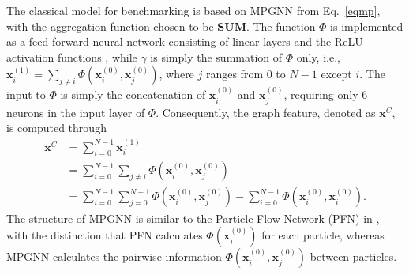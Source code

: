 \documentclass[reprint,amsmath,amssymb,prd,nofootinbib]{revtex4-2}
\def\xbf{\mathbf{x}}
\begin{document}
The classical model for benchmarking is based on MPGNN from Eq.~\ref{eqmp}, with the aggregation function chosen to be \textbf{SUM}. The function $\Phi$ is implemented as a feed-forward neural network consisting of linear layers and the ReLU activation functions \cite{relu}, while $\gamma$ is simply the summation of $\Phi$ only, i.e., $\xbf^{(1)}_i=\sum_{j \neq i}\Phi(\xbf^{(0)}_i,\xbf^{(0)}_{j})$, where $j$ ranges from 0 to $N-1$ except $i$. The input to $\Phi$ is simply the concatenation of $\xbf^{(0)}_i$ and $\xbf^{(0)}_j$, requiring only 6 neurons in the input layer of $\Phi$. Consequently, the graph feature, denoted as $\xbf^C$, is computed through
\begin{equation} \label{XC}
    \begin{split}
        \xbf^C &= \sum^{N-1}_{i=0}\xbf^{(1)}_i \\
        &= \sum^{N-1}_{i=0}\sum_{j \neq i}\Phi(\xbf^{(0)}_i,\xbf^{(0)}_j) \\
        &= \sum^{N-1}_{i=0}\sum^{N-1}_{j=0}\Phi(\xbf^{(0)}_i,\xbf^{(0)}_j) - \sum^{N-1}_{i=0}\Phi(\xbf^{(0)}_i,\xbf^{(0)}_i).
    \end{split}
\end{equation}
The structure of MPGNN is similar to the Particle Flow Network (PFN) in \cite{pfn}, with the distinction that PFN calculates $\Phi(\xbf^{(0)}_i)$ for each particle, whereas MPGNN calculates the pairwise information $\Phi(\xbf^{(0)}_i, \xbf^{(0)}_j)$ between particles.
\end{document}
